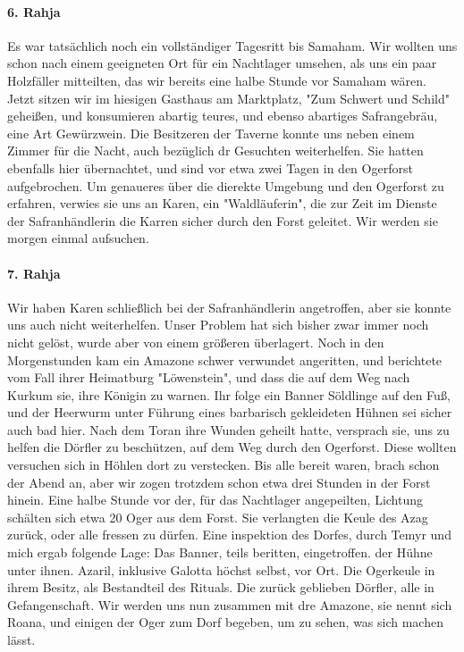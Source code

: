 \paragraph{6. Rahja}
Es war tatsächlich noch ein vollständiger Tagesritt bis Samaham. Wir wollten uns schon nach einem geeigneten Ort für ein Nachtlager umsehen, als uns ein paar Holzfäller mitteilten, das wir bereits eine halbe Stunde vor Samaham wären. Jetzt sitzen wir im hiesigen Gasthaus am Marktplatz, "Zum Schwert und Schild" geheißen, und konsumieren abartig teures, und ebenso abartiges Safrangebräu, eine Art Gewürzwein. Die Besitzeren der Taverne konnte uns neben einem Zimmer für die Nacht, auch bezüglich dr Gesuchten weiterhelfen. Sie hatten ebenfalls hier übernachtet, und sind vor etwa zwei Tagen in den Ogerforst aufgebrochen. Um genaueres über die dierekte Umgebung und den Ogerforst zu erfahren, verwies sie uns an Karen, ein "Waldläuferin", die zur Zeit im Dienste der Safranhändlerin die Karren sicher durch den Forst geleitet. Wir werden sie morgen einmal aufsuchen.

\paragraph{7. Rahja}
Wir haben Karen schließlich bei der Safranhändlerin angetroffen, aber sie konnte uns auch nicht weiterhelfen. Unser Problem hat sich bisher zwar immer noch nicht gelöst, wurde aber von einem größeren überlagert. Noch in den Morgenstunden kam ein Amazone schwer verwundet angeritten, und berichtete vom Fall ihrer Heimatburg "Löwenstein", und dass die auf dem Weg nach Kurkum sie, ihre Königin zu warnen. Ihr folge ein Banner Söldlinge auf den Fuß, und der Heerwurm unter Führung eines barbarisch gekleideten Hühnen sei sicher auch bad hier. Nach dem Toran ihre Wunden geheilt hatte, versprach sie, uns zu helfen die Dörfler zu beschützen, auf dem Weg durch den Ogerforst. Diese wollten versuchen sich in Höhlen dort zu verstecken. Bis alle bereit waren, brach schon der Abend an, aber wir zogen trotzdem schon etwa drei Stunden in der Forst hinein. Eine halbe Stunde vor der, für das Nachtlager angepeilten, Lichtung schälten sich etwa 20 Oger aus dem Forst. Sie verlangten die Keule des Azag zurück, oder alle fressen zu dürfen. Eine inspektion des Dorfes, durch Temyr und mich ergab folgende Lage: Das Banner, teils beritten, eingetroffen. der Hühne unter ihnen. Azaril, inklusive Galotta höchst selbst, vor Ort. Die Ogerkeule in ihrem Besitz, als Bestandteil des Rituals. Die zurück geblieben Dörfler, alle in Gefangenschaft. Wir werden uns nun zusammen mit dre Amazone, sie nennt sich Roana, und einigen der Oger zum Dorf begeben, um zu sehen, was sich machen lässt.

